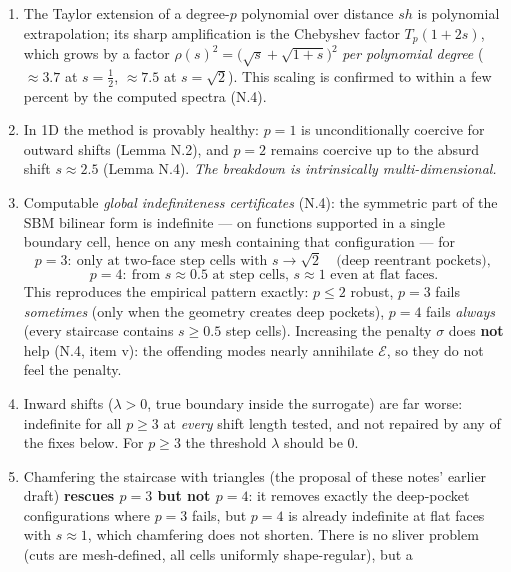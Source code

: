 \begin{enumerate}
  \item The Taylor extension of a degree-$p$ polynomial over distance $sh$
        is polynomial extrapolation; its sharp amplification is the
        Chebyshev factor $T_p(1+2s)$, which grows by a factor
        $\rho(s)^2 = \big(\sqrt s + \sqrt{1+s}\big)^2$ \emph{per polynomial
        degree} ($\approx 3.7$ at $s=\tfrac12$, $\approx 7.5$ at
        $s=\sqrt2$). This scaling is confirmed to within a few percent by
        the computed spectra (N.4).
  \item In 1D the method is provably healthy: $p=1$ is unconditionally
        coercive for outward shifts (Lemma N.2), and $p=2$ remains coercive
        up to the absurd shift $s \approx 2.5$ (Lemma N.4). \emph{The
        breakdown is intrinsically multi-dimensional.}
  \item Computable \emph{global indefiniteness certificates} (N.4): the
        symmetric part of the SBM bilinear form is indefinite ---
        on functions supported in a single boundary cell, hence on any mesh
        containing that configuration --- for
        \[
          p = 3:\ \text{only at two-face step cells with } s \to \sqrt 2
          \quad\text{(deep reentrant pockets)},
        \]
        \[
          p = 4:\ \text{from } s \approx 0.5 \text{ at step cells, } s
          \approx 1 \text{ even at flat faces.}
        \]
        This reproduces the empirical pattern exactly: $p\le2$ robust,
        $p=3$ fails \emph{sometimes} (only when the geometry creates deep
        pockets), $p=4$ fails \emph{always} (every staircase contains
        $s \ge 0.5$ step cells). Increasing the penalty $\sigma$ does
        \textbf{not} help (N.4, item v): the offending modes nearly
        annihilate $\mathcal E$, so they do not feel the penalty.
  \item Inward shifts ($\lambda > 0$, true boundary inside the surrogate)
        are far worse: indefinite for all $p \ge 3$ at \emph{every} shift
        length tested, and not repaired by any of the fixes below. For
        $p \ge 3$ the threshold $\lambda$ should be $0$.
  \item Chamfering the staircase with triangles (the proposal of these
        notes' earlier draft) \textbf{rescues $p=3$ but not $p=4$}: it
        removes exactly the deep-pocket configurations where $p=3$ fails,
        but $p=4$ is already indefinite at flat faces with $s \approx 1$,
        which chamfering does not shorten. There is no sliver problem
        (cuts are mesh-defined, all cells uniformly shape-regular), but a

\end{enumerate}
